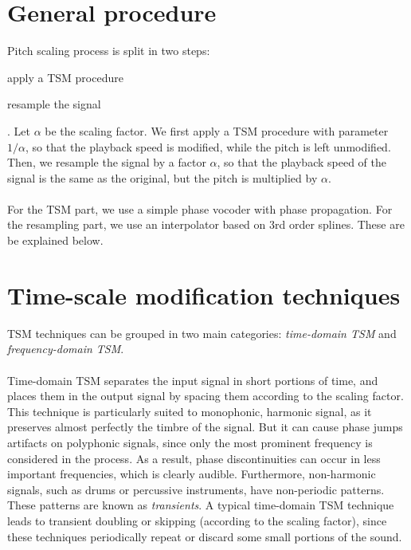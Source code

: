 \documentclass[letterpaper]{article}
\begin{document}
\section{General procedure}
Pitch scaling process is split in two steps: \begin{enumerate*}[label=\arabic*)]
\item apply a TSM procedure \item resample the signal\end{enumerate*}. Let
\(\alpha\) be the scaling factor. We first apply a TSM procedure with parameter
\(1/\alpha\), so that the playback speed is modified, while the pitch is left
unmodified. Then, we resample the signal by a factor \(\alpha\), so that the
playback speed of the signal is the same as the original, but the pitch is
multiplied by \(\alpha\).
\paragraph{}
For the TSM part, we use a simple phase vocoder with phase propagation. For the
resampling part, we use an interpolator based on 3rd order splines. These are
be explained below.

\section{Time-scale modification techniques}
TSM techniques can be grouped in two main categories: \emph{time-domain TSM} and
\emph{frequency-domain TSM}.
\paragraph{}
Time-domain TSM separates the input signal in short portions of
time, and places them in the output signal by spacing them according to the
scaling factor. This technique is particularly suited to monophonic, harmonic
signal, as it preserves almost perfectly the timbre of the signal. But it can
cause phase jumps artifacts on polyphonic signals, since only the most prominent
frequency is considered in the process. As a result, phase discontinuities can
occur in less important frequencies, which is clearly audible. Furthermore,
non-harmonic signals, such as drums or percussive instruments, have non-periodic
patterns. These patterns are known as \emph{transients}. A typical time-domain
TSM technique leads to transient doubling or skipping (according to the scaling
factor), since these techniques periodically repeat or discard some small
portions of the sound.
\end{document}
